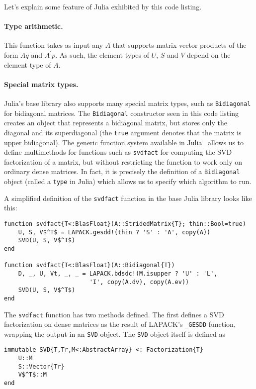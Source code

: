 \documentclass[final,leqno]{siamltex1213}
\begin{document}
Let's explain some feature of Julia exhibited by this code listing.

\paragraph{Type arithmetic.}
This function takes as input any $A$ that supports
matrix-vector products of the form $Aq$ and $A^\prime p$. As such, the element
types of $U$, $S$ and $V$ depend on the element type of $A$.

\paragraph{Special matrix types.}
Julia's base library also supports many special matrix types, such as
\verb|Bidiagonal| for bidiagonal matrices. The \verb|Bidiagonal| constructor
seen in this code listing creates an object that represents a bidiagonal
matrix, but stores only the diagonal and its superdiagonal (the \verb|true|
argument denotes that the matrix is upper bidiagonal). The generic function
system available in Julia~\cite{Bezanson2012,Bezanson2015} allows us to define
multimethods for functions such as \verb|svdfact| for computing the SVD
factorization of a matrix, but without restricting the function to work only
on ordinary dense matrices. In fact, it is precisely the definition of a
\verb|Bidiagonal| object (called a \verb|type| in Julia) which allows us to
specify which algorithm to run.

A simplified definition of the \verb|svdfact| function in the base Julia
library looks like this:

\begin{lstlisting}
function svdfact{T<:BlasFloat}(A::StridedMatrix{T}; thin::Bool=true)
    U, S, V$^T$ = LAPACK.gesdd!(thin ? 'S' : 'A', copy(A))
    SVD(U, S, V$^T$)
end

function svdfact{T<:BlasFloat}(A::Bidiagonal{T})
    D, _, U, Vt, _, _ = LAPACK.bdsdc!(M.isupper ? 'U' : 'L',
                        'I', copy(A.dv), copy(A.ev))
    SVD(U, S, V$^T$)
end
\end{lstlisting}

The \verb|svdfact| function has two methods defined. The first defines a SVD
factorization on dense matrices as the result of LAPACK's \verb|_GESDD|
function, wrapping the output in an \verb|SVD| object. The \verb|SVD| object itself is defined as

\begin{lstlisting}
immutable SVD{T,Tr,M<:AbstractArray} <: Factorization{T}
    U::M
    S::Vector{Tr}
    V$^T$::M
end
\end{lstlisting}
\end{document}

